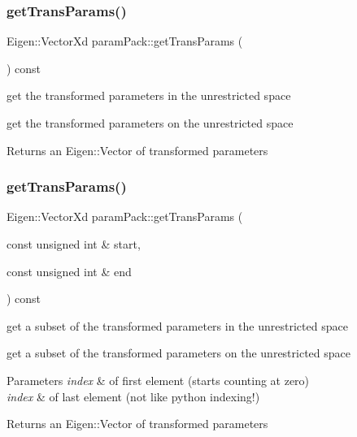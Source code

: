 \subsubsection{\texorpdfstring{get\+Trans\+Params()}{getTransParams()}\hspace{0.1cm}{\footnotesize\ttfamily [1/2]}}
{\footnotesize\ttfamily Eigen\+::\+Vector\+Xd param\+Pack\+::get\+Trans\+Params (\begin{DoxyParamCaption}{ }\end{DoxyParamCaption}) const}



get the transformed parameters in the unrestricted space 

get the transformed parameters on the unrestricted space \begin{DoxyReturn}{Returns}
an Eigen\+::\+Vector of transformed parameters 
\end{DoxyReturn}
\mbox{\label{classparamPack_aab8d550dbd4f28fce067197ba96f80fa}} 
\subsubsection{\texorpdfstring{get\+Trans\+Params()}{getTransParams()}\hspace{0.1cm}{\footnotesize\ttfamily [2/2]}}
{\footnotesize\ttfamily Eigen\+::\+Vector\+Xd param\+Pack\+::get\+Trans\+Params (\begin{DoxyParamCaption}\item[{const unsigned int \&}]{start,  }\item[{const unsigned int \&}]{end }\end{DoxyParamCaption}) const}



get a subset of the transformed parameters in the unrestricted space 

get a subset of the transformed parameters on the unrestricted space 
\begin{DoxyParams}{Parameters}
{\em index} & of first element (starts counting at zero) \\
\hline
{\em index} & of last element (not like python indexing!) \\
\hline
\end{DoxyParams}
\begin{DoxyReturn}{Returns}
an Eigen\+::\+Vector of transformed parameters 
\end{DoxyReturn}
\mbox{\label{classparamPack_afd45bfe2c0c9d157df3f146d57bc492d}} 
